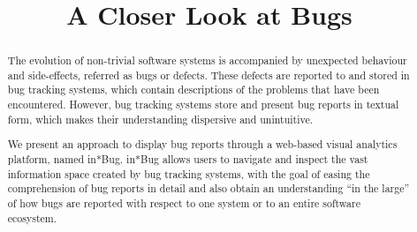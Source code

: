 


\usepackage{xspace,graphicx,url,paralist} %

\usepackage{xcolor,colortbl}


\newcommand{\ie}{\textit{i.e.,}\xspace}
\newcommand{\eg}{\textit{e.g.,}\xspace}
\newcommand{\etc}{\textit{etc.}\xspace}
\newcommand{\etal}{\textit{et al.}\xspace}
\newcommand{\ib}{in*Bug\xspace}
\newcommand{\secref}[1]{Section~\ref{#1}\xspace}
\newcommand{\figref}[1]{Figure~\ref{#1}\xspace}
\newcommand{\tabref}[1]{Table~\ref{#1}\xspace}


\title{A Closer Look at Bugs}


\author{
}



\maketitle


\begin{abstract}


The evolution of non-trivial software systems is accompanied by unexpected behaviour and side-effects, referred as bugs or defects. These defects are reported to and stored in bug tracking systems, which contain descriptions of the problems that have been encountered. However, bug tracking systems store and present bug reports in textual form, which makes their understanding dispersive and unintuitive. 

We present an approach to display bug reports through a web-based visual analytics platform, named in*Bug. \ib allows users to navigate and inspect the vast information space created by bug tracking systems, with the goal of easing the comprehension of bug reports in detail and also obtain an understanding ``in the large'' of how bugs are reported with respect to one system or to an entire software ecosystem. 

\end{abstract}


